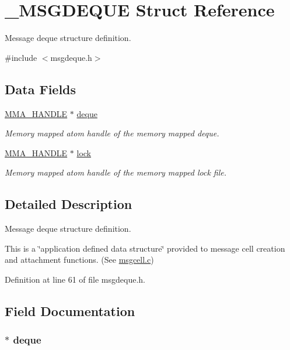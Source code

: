\hypertarget{struct___m_s_g_d_e_q_u_e}{\section{\-\_\-\-M\-S\-G\-D\-E\-Q\-U\-E Struct Reference}
\label{struct___m_s_g_d_e_q_u_e}
}


Message deque structure definition.  




{\ttfamily \#include $<$msgdeque.\-h$>$}

\subsection*{Data Fields}
\begin{DoxyCompactItemize}
\item 
\hyperlink{struct_m_m_a___h_a_n_d_l_e}{M\-M\-A\-\_\-\-H\-A\-N\-D\-L\-E} $\ast$ \hyperlink{struct___m_s_g_d_e_q_u_e_ae6a89c13fecd2dcbc68ba59c6c9835c3}{deque}
\begin{DoxyCompactList}\small\item\em Memory mapped atom handle of the memory mapped deque. \end{DoxyCompactList}\item 
\hyperlink{struct_m_m_a___h_a_n_d_l_e}{M\-M\-A\-\_\-\-H\-A\-N\-D\-L\-E} $\ast$ \hyperlink{struct___m_s_g_d_e_q_u_e_a45bb7f6a07d34dd2621a5488b5006ffb}{lock}
\begin{DoxyCompactList}\small\item\em Memory mapped atom handle of the memory mapped lock file. \end{DoxyCompactList}\end{DoxyCompactItemize}


\subsection{Detailed Description}
Message deque structure definition. 

This is a \char`\"{}application defined data structure\char`\"{} provided to message cell creation and attachment functions. (See \hyperlink{msgcell_8c}{msgcell.\-c}) 

Definition at line 61 of file msgdeque.\-h.



\subsection{Field Documentation}
\hypertarget{struct___m_s_g_d_e_q_u_e_ae6a89c13fecd2dcbc68ba59c6c9835c3}{
\subsubsection[{deque}]{$\ast$ deque}}\label{struct___m_s_g_d_e_q_u_e_ae6a89c13fecd2dcbc68ba59c6c9835c3}


